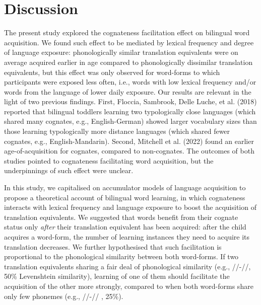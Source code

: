 \documentclass[
  man,
  floatsintext,
  colorlinks=true,linkcolor=blue,citecolor=blue,urlcolor=blue,biblatex]{apa7}
\begin{document}
\hypertarget{sec-discussion}{%
\section{Discussion}\label{sec-discussion}}

The present study explored the cognateness facilitation effect on
bilingual word acquisition. We found such effect to be mediated by
lexical frequency and degree of language exposure: phonologically
similar translation equivalents were on average acquired earlier in age
compared to phonologically dissimilar translation equivalents, but this
effect was only observed for word-forms to which participants were
exposed less often, i.e., words with low lexical frequency and/or words
from the language of lower daily exposure. Our results are relevant in
the light of two previous findings. First, Floccia, Sambrook, Delle
Luche, et al. (2018) reported that bilingual toddlers learning two
typologically close languages (which shared many cognates, e.g.,
English-German) showed larger vocabulary sizes than those learning
typologically more distance languages (which shared fewer cognates,
e.g., English-Mandarin). Second, Mitchell et al. (2022) found an earlier
age-of-acquisition for cognates, compared to non-cognates. The outcomes
of both studies pointed to cognateness facilitating word acquisition,
but the underpinnings of such effect were unclear.

In this study, we capitalised on accumulator models of language
acquisition to propose a theoretical account of bilingual word learning,
in which cognateness interacts with lexical frequency and language
exposure to boost the acquisition of translation equivalents. We
suggested that words benefit from their cognate status only \emph{after}
their translation equivalent has been acquired: after the child acquires
a word-form, the number of learning instances they need to acquire its
translation decreases. We further hypothesised that such facilitation is
proportional to the phonological similarity between both word-forms. If
two translation equivalents sharing a fair deal of phonological
similarity (e.g., //-//, 50\%
Levenshtein similarity), learning of one of them should facilitate the
acquisition of the other more strongly, compared to when both word-forms
share only few phonemes (e.g.,
//-// , 25\%).
\end{document}
